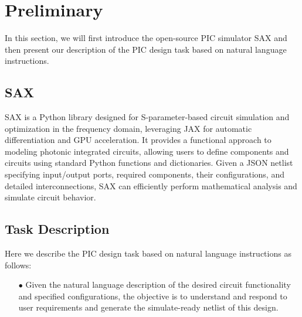 \section{Preliminary}
\label{sec:prelim}

In this section, we will first introduce the open-source PIC simulator SAX \cite{sax2023} and then present our description of the PIC design task based on natural language instructions.

\subsection{SAX}
SAX is a Python library designed for S-parameter-based circuit simulation and optimization in the frequency domain, leveraging JAX for automatic differentiation and GPU acceleration. 
It provides a functional approach to modeling photonic integrated circuits, allowing users to define components and circuits using standard Python functions and dictionaries.
Given a JSON netlist specifying input/output ports, required components, their configurations, and detailed interconnections, SAX can efficiently perform mathematical analysis and simulate circuit behavior.
\subsection{Task Description}
Here we describe the PIC design task based on natural language instructions as follows:
\begin{itemize}
\item[$\bullet$]
Given the natural language description of the desired circuit functionality and specified configurations, the objective is to understand and respond to user requirements and generate the simulate-ready netlist of this design.
\end{itemize}